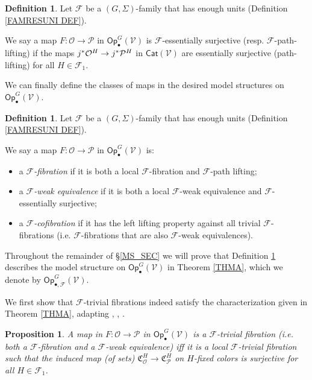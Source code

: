\documentclass[a4paper,10pt
 ,final
]{article}%
\numberwithin{equation}{section}
\numberwithin{figure}{section}
\newtheorem{proposition}[equation]{Proposition}%
\theoremstyle{definition} %
\newtheorem{definition}[equation]{Definition}%
\newcommand{\F}{\ensuremath{\mathcal F}}
\newcommand{\V}{\ensuremath{\mathcal V}}
\renewcommand{\O}{\ensuremath{\mathcal O}}
\renewcommand{\P}{\ensuremath{\mathcal P}}
\newcommand{\1}{\ensuremath{\mathbbm 1}}%
\begin{document}
\begin{definition}\label{FESSENSURJ DEF}
Let $\F$ be a $(G, \Sigma)$-family that has enough units
(Definition \ref{FAMRESUNI DEF}).

We say a map $F: \O \to \P$ in $\mathsf{Op}^G_\bullet(\V)$
is $\F$-essentially surjective (resp. $\F$-path-lifting)
if the maps
$j^{\**}\O^H \to j^{\**} \P^H$
in $\mathsf{Cat}(\V)$ are essentially surjective (path-lifting) for all $H \in \F_1$.
\end{definition}



We can finally define the classes of maps in the desired model structures on $\mathsf{Op}^G_\bullet(\V)$.



\begin{definition}\label{MODEL_DEFN}
Let $\F$ be a $(G, \Sigma)$-family that has enough units
(Definition \ref{FAMRESUNI DEF}).

We say a map $F: \O \to \P$ in $\mathsf{Op}^G_\bullet(\V)$ is:
\begin{itemize}
	\item a {\em $\F$-fibration} if it is both a local $\F$-fibration and $\F$-path lifting;
	\item a {\em $\F$-weak equivalence} if it is both a local $\F$-weak equivalence and $\F$-essentially surjective;
	\item a \textit{$\F$-cofibration} if it has the left lifting property against all trivial $\F$-fibrations (i.e. $\F$-fibrations that are also $\F$-weak equivalences).
\end{itemize}
\end{definition}


Throughout the remainder of \S \ref{MS_SEC}
we will prove that 
Definition \ref{MODEL_DEFN} describes the model structure on 
$\mathsf{Op}^G_\bullet(\V)$
in Theorem \ref{THMA},
which we denote by
$\mathsf{Op}^G_{\bullet, \F}(\V)$.



We first show that $\F$-trivial fibrations
indeed satisfy the characterization given in Theorem \ref{THMA},
adapting \cite[4.8]{Cav}, \cite[2.3]{BM13}, \cite[1.18]{CM13b}.

\begin{proposition}\label{FTRIVCHAR PROP}
A map in $F: \O \to \P$ in $\mathsf{Op}^G_\bullet(\V)$ is 
a $\F$-trivial fibration (i.e. both a $\F$-fibration and a $\F$-weak equivalence) 
iff it is a local $\F$-trivial fibration
such that the induced map (of sets) $\mathfrak C_\O^H \to \mathfrak C_\P^H$ on $H$-fixed colors is surjective
for all $H \in \F_1$.
\end{proposition}
\end{document}
